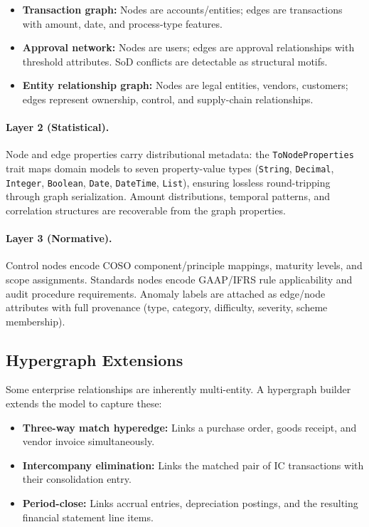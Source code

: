 \begin{itemize}
  \item \textbf{Transaction graph:} Nodes are accounts/entities; edges
    are transactions with amount, date, and process-type features.
  \item \textbf{Approval network:} Nodes are users; edges are approval
    relationships with threshold attributes.  SoD conflicts are
    detectable as structural motifs.
  \item \textbf{Entity relationship graph:} Nodes are legal entities,
    vendors, customers; edges represent ownership, control, and
    supply-chain relationships.
\end{itemize}

\paragraph{Layer 2 (Statistical).}
Node and edge properties carry distributional metadata: the
\texttt{ToNodeProperties} trait maps domain models to seven
property-value types (\texttt{String}, \texttt{Decimal},
\texttt{Integer}, \texttt{Boolean}, \texttt{Date}, \texttt{DateTime},
\texttt{List}), ensuring lossless round-tripping through graph
serialization.  Amount distributions, temporal patterns, and
correlation structures are recoverable from the graph properties.

\paragraph{Layer 3 (Normative).}
Control nodes encode COSO component/principle mappings, maturity
levels, and scope assignments.  Standards nodes encode GAAP/IFRS rule
applicability and audit procedure requirements.  Anomaly labels are
attached as edge/node attributes with full provenance (type, category,
difficulty, severity, scheme membership).

\subsection{Hypergraph Extensions}
\label{sec:kg_hypergraph}

Some enterprise relationships are inherently multi-entity.  A hypergraph
builder extends the model to capture these:

\begin{itemize}
  \item \textbf{Three-way match hyperedge:} Links a purchase order,
    goods receipt, and vendor invoice simultaneously.
  \item \textbf{Intercompany elimination:} Links the matched pair of IC
    transactions with their consolidation entry.
  \item \textbf{Period-close:} Links accrual entries, depreciation
    postings, and the resulting financial statement line items.
\end{itemize}

